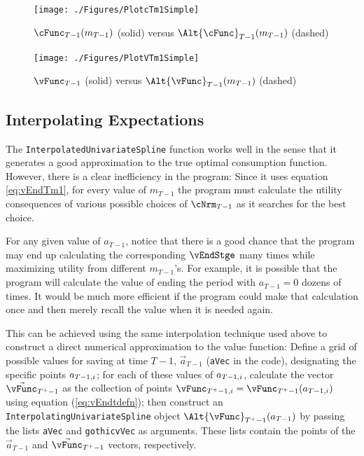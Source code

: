 \documentclass[titlepage, headings=optiontotocandhead]{\econtex}
\begin{document}
\hypertarget{PlotcTm1Simple}{}
\begin{figure}
  \centerline{\texttt{[image: ./Figures/PlotcTm1Simple]}}
  \caption{$\cFunc_{T-1}({m}_{T-1})$ (solid) versus $\Alt{\cFunc}_{T-1}({m}_{T-1})$ (dashed)}
  \label{fig:PlotcTm1Simple}
\end{figure}

\hypertarget{PlotvTm1Simple}{}
\begin{figure}
  \centerline{\texttt{[image: ./Figures/PlotVTm1Simple]}}
  \caption{$\vFunc_{T-1}$ (solid) versus $\Alt{\vFunc}_{T-1}({m}_{T-1})$ (dashed)}
  \label{fig:PlotVTm1Simple}
\end{figure}

\hypertarget{Interpolating-Expectations}{}
\subsection{Interpolating Expectations}


The \texttt{InterpolatedUnivariateSpline} function works well in the sense that it generates a good approximation to the true optimal consumption function. However, there is a clear inefficiency in the program: Since it uses equation \eqref{eq:vEndTm1}, for every value of ${m}_{T-1}$ the program must calculate the utility consequences of various possible choices of $\cNrm_{T-1}$ as it searches for the best choice.

For any given value of ${a}_{T-1}$, notice that there is a good chance that the program may end up calculating the corresponding $\vEndStge$ many times while maximizing utility from different ${m}_{T-1}$'s.  For example, it is possible that the program will calculate the value of ending the period with ${a}_{T-1}=0$ dozens of times.  It would be much more efficient if the program could make that calculation once and then merely recall the value when it is needed again.

This can be achieved using the same interpolation technique used above
to construct a direct numerical approximation to the value function:
Define a grid of possible values for saving at time $T-1$,
$\vec{a}_{T-1}$
(\texttt{aVec}
in the code), designating the
specific points $\null{a}_{T-1,i}$; for each of these values of
$\null{a}_{T-1,i}$, calculate the vector $\vec{\vFunc}_{T^{+}-1}$ as the collection of points $\vFunc_{T^{+}-1,i} =
\vFunc_{T^{+}-1}(\null{a}_{T-1,i})$ using equation
(\ref{eq:vEndtdefn}); then construct an
\texttt{InterpolatingUnivariateSpline} object
$\Alt{\vFunc}_{T^{+}-1}({a}_{T-1})$ by passing the lists \texttt{aVec} and \texttt{gothicvVec} as arguments.
These lists contain the points of the $\vec{a}_{T-1}$ and $\vec{\vFunc}_{T^{+}-1}$ vectors, respectively.
\end{document}
